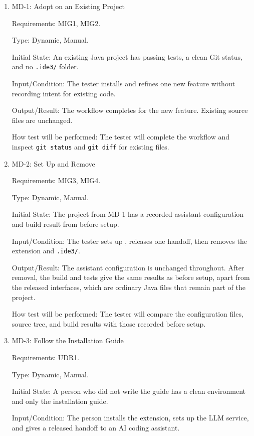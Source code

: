 \documentclass[12pt, titlepage]{article}
\begin{document}
\begin{enumerate}

\item{MD-1: Adopt on an Existing Project\\}

Requirements: MIG1, MIG2.

Type: Dynamic, Manual.

Initial State: An existing Java project has passing tests, a clean Git status, and no
\texttt{.ide3/} folder.

Input/Condition: The tester installs \progname{} and refines one new feature without
recording intent for existing code.

Output/Result: The workflow completes for the new feature. Existing source files are
unchanged.

How test will be performed: The tester will complete the workflow and inspect
\texttt{git status} and \texttt{git diff} for existing files.

\item{MD-2: Set Up and Remove \progname{}\\}

Requirements: MIG3, MIG4.

Type: Dynamic, Manual.

Initial State: The project from MD-1 has a recorded assistant configuration and build
result from before setup.

Input/Condition: The tester sets up \progname{}, releases one handoff, then removes the
extension and \texttt{.ide3/}.

Output/Result: The assistant configuration is unchanged throughout. After removal, the
build and tests give the same results as before setup, apart from the released
interfaces, which are ordinary Java files that remain part of the project.

How test will be performed: The tester will compare the configuration files, source
tree, and build results with those recorded before setup.

\item{MD-3: Follow the Installation Guide\\}

Requirements: UDR1.

Type: Dynamic, Manual.

Initial State: A person who did not write the guide has a clean environment and only the
installation guide.

Input/Condition: The person installs the extension, sets up the LLM service, and gives
a released handoff to an AI coding assistant.


\end{enumerate}
\end{document}

